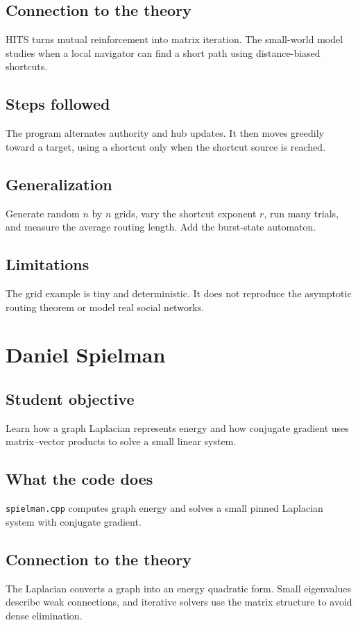 \documentclass[11pt]{book}
\begin{document}
\section{Connection to the theory}
HITS turns mutual reinforcement into matrix iteration. The small-world model studies when a local navigator can find a short path using distance-biased shortcuts.

\section{Steps followed}
The program alternates authority and hub updates. It then moves greedily toward a target, using a shortcut only when the shortcut source is reached.

\section{Generalization}
Generate random $n$ by $n$ grids, vary the shortcut exponent $r$, run many trials, and measure the average routing length. Add the burst-state automaton.

\section{Limitations}
The grid example is tiny and deterministic. It does not reproduce the asymptotic routing theorem or model real social networks.

\chapter{Daniel Spielman}
\section{Student objective}
Learn how a graph Laplacian represents energy and how conjugate gradient uses matrix--vector products to solve a small linear system.
\section{What the code does}
\texttt{spielman.cpp} computes graph energy and solves a small pinned Laplacian system with conjugate gradient.

\section{Connection to the theory}
The Laplacian converts a graph into an energy quadratic form. Small eigenvalues describe weak connections, and iterative solvers use the matrix structure to avoid dense elimination.
\end{document}
